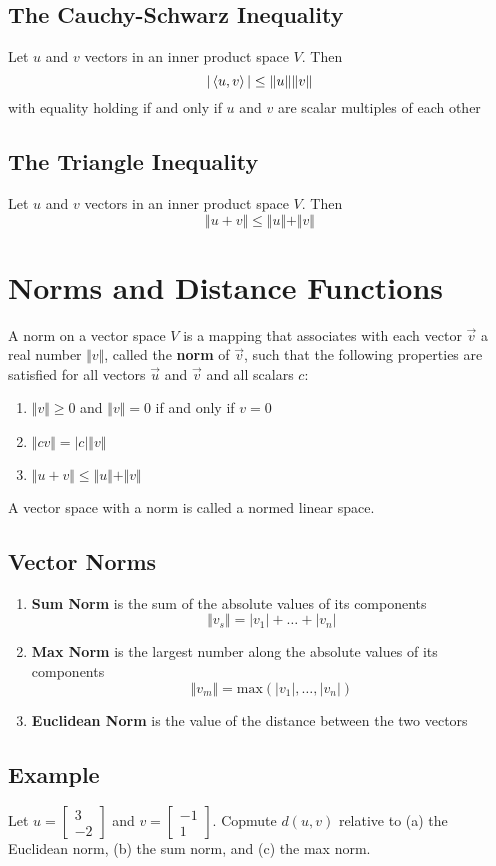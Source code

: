 \subsection*{The Cauchy-Schwarz Inequality}
Let $u$ and $v$ vectors in an inner product space $V$. Then
\[|\ev{u,v}|\leq\Vert{u}\Vert\Vert{v}\Vert\]
with equality holding if and only if $u$ and $v$ are scalar multiples of each other
\subsection*{The Triangle Inequality}
Let $u$ and $v$ vectors in an inner product space $V$. Then
\[\Vert{u+v}\Vert\leq\Vert{u}\Vert+\Vert{v}\Vert\]

\section{Norms and Distance Functions}
A norm on a vector space $V$ is a mapping that associates with each vector $\vec{v}$ a
real number $\Vert v\Vert$, called the \textbf{norm} of $\vec{v}$,
such that the following properties are satisfied for all vectors
$\vec{u}$ and $\vec{v}$ and all scalars $c$:
\begin{enumerate}
    \item $\Vert v\Vert\geq0$ and $\Vert v\Vert=0$ if and only if $v=0$
    \item $\Vert cv\Vert=|c|\Vert v\Vert$
    \item $\Vert u+v\Vert\leq\Vert u\Vert+\Vert v\Vert$
\end{enumerate}
A vector space with a norm is called a \textbf{}{normed linear space}.

\subsection*{Vector Norms}
\begin{enumerate}
    \item \textbf{Sum Norm} is the sum of the absolute values of its components
          \[\Vert v_s\Vert=|v_1|+\dots+|v_n|\]
    \item \textbf{Max Norm} is the largest number along the absolute values of its components
          \[\Vert v_m\Vert =\text{max}(|v_1|,\dots,|v_n|)\]
    \item \textbf{Euclidean Norm} is the value of the distance between the two vectors
\end{enumerate}

\subsection*{Example}
Let $u=\begin{bmatrix}
        3 \\-2
    \end{bmatrix}$ and $v=\begin{bmatrix}
        -1 \\1
    \end{bmatrix}$. Copmute $d(u,v)$ relative to (a) the Euclidean norm, (b)
the sum norm, and (c) the max norm.


